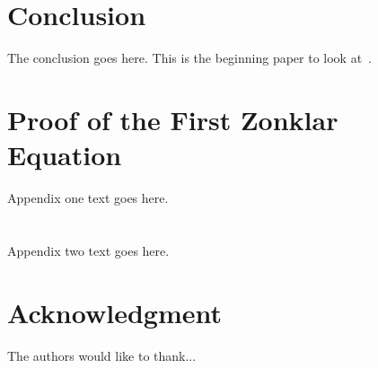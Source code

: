 \documentclass[journal]{IEEEtran}
\begin{document}
\section{Conclusion}
The conclusion goes here. This is the beginning paper to look at~\cite{Ratha2020}.


%

\appendices
\section{Proof of the First Zonklar Equation}
Appendix one text goes here.

\section{}
Appendix two text goes here.


\section*{Acknowledgment}


The authors would like to thank...


\ifCLASSOPTIONcaptionsoff
  \newpage
\fi
\end{document}
